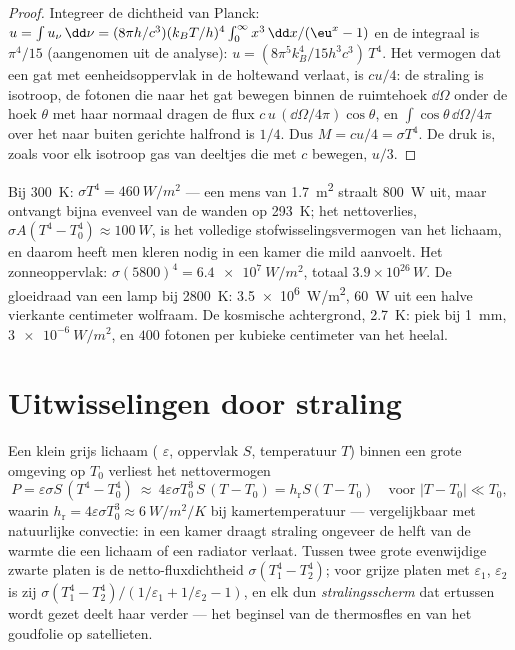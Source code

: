 \begin{proof}
Integreer de dichtheid van Planck:
$u = \int u_\nu\,\dd\nu = (8\pi h/c^3)(k_BT/h)^4
\int_0^\infty x^3\,\dd x/(\eu^x - 1)$
en de integraal is $\pi^4/15$
(aangenomen uit de analyse): $u = (8\pi^5k_B^4/15h^3c^3)\,T^4$. Het vermogen dat
een gat met eenheidsoppervlak in de holtewand verlaat, is $cu/4$: de
straling is isotroop, de fotonen die naar het gat bewegen binnen de
ruimtehoek $\dd\Omega$ onder de hoek $\theta$ met haar normaal dragen de
flux $c\,u\,(\dd\Omega/4\pi)\cos\theta$, en $\int\cos\theta\,\dd\Omega/4\pi$
over het naar buiten gerichte halfrond is $1/4$. Dus $M = cu/4 = \sigma T^4$.
De druk is, zoals voor elk isotroop gas van deeltjes die met $c$ bewegen,
$u/3$.
\end{proof}

\begin{example}\label{ex:b2:thermal-radiation:orders}
Bij \qty{300}{K}: $\sigma T^4 = \qty{460}{W/m^2}$ --- een mens van
\qty{1.7}{m^2} straalt \qty{800}{W} uit, maar ontvangt bijna evenveel van
de wanden op \qty{293}{K}; het nettoverlies,
$\sigma A(T^4 - T_0^4) \approx
\qty{100}{W}$, is het volledige
stofwisselingsvermogen van het lichaam, en daarom
heeft men kleren nodig in een kamer die mild aanvoelt. Het zonneoppervlak:
$\sigma
(5800)^4 = \qty{6.4e7}{W/m^2}$, totaal
$3.9 \times 10^{26}\,\unit{W}$. De
gloeidraad van een lamp bij \qty{2800}{K}: \qty{3.5e6}{W/m^2}, \qty{60}{W}
uit een halve
vierkante centimeter wolfraam. De kosmische achtergrond, \qty{2.7}{K}:
piek bij \qty{1}{mm}, $\qty{3e-6}{W/m^2}$, en $400$ fotonen per kubieke
centimeter van het heelal.
\end{example}

\section{Uitwisselingen door straling}

\begin{proposition}\label{prop:b2:thermal-radiation:exchange}
Een klein grijs lichaam ( $\varepsilon$, oppervlak $S$,
temperatuur $T$)
binnen een grote omgeving op $T_0$ verliest het nettovermogen
\[
P = \varepsilon\sigma S\,(T^4 - T_0^4)
\ \approx\ 4\varepsilon\sigma T_0^3\,S\,(T - T_0) = h_{\text{r}}S(T - T_0)
\quad\text{voor } |T - T_0| \ll T_0 ,
\]
waarin $h_{\text{r}} = 4\varepsilon\sigma T_0^3 \approx \qty{6}{W/m^2/K}$ bij
kamertemperatuur --- vergelijkbaar met natuurlijke convectie: in een kamer
draagt straling ongeveer de helft van de warmte die een lichaam of een
radiator verlaat.
Tussen twee grote evenwijdige zwarte platen is de netto-fluxdichtheid
$\sigma(T_1^4 - T_2^4)$; voor grijze platen met  $\varepsilon_1$,
$\varepsilon_2$ is zij
$\sigma(T_1^4 - T_2^4)/(1/\varepsilon_1 + 1/\varepsilon_2
- 1)$, en elk dun
\emph{stralingsscherm} dat ertussen wordt gezet deelt haar
verder --- het beginsel van de thermosfles en van het goudfolie op
satellieten.
\end{proposition}

